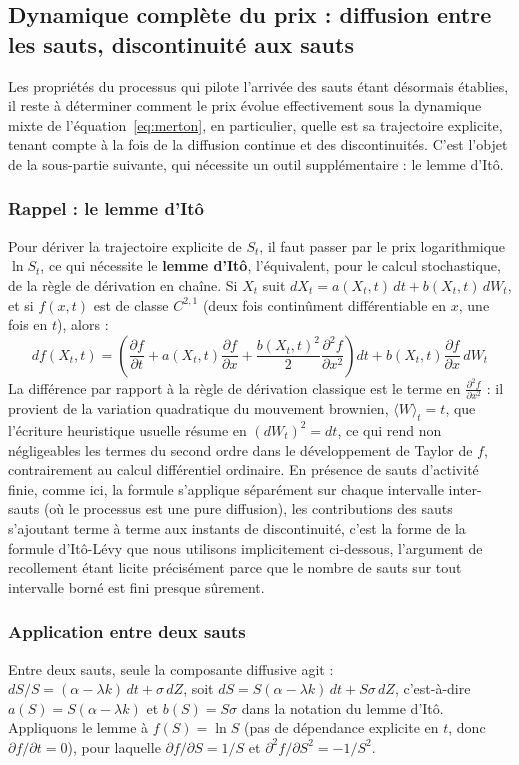\documentclass{article}
\begin{document}
\subsection{Dynamique complète du prix : diffusion entre les sauts, discontinuité aux sauts}
Les propriétés du processus qui pilote l'arrivée des sauts étant désormais établies, il reste à déterminer comment le prix évolue effectivement sous la dynamique mixte de l'équation~\eqref{eq:merton}, en particulier, quelle est sa trajectoire explicite, tenant compte à la fois de la diffusion continue et des discontinuités. C'est l'objet de la sous-partie suivante, qui nécessite un outil supplémentaire : le lemme d'Itô.
\subsubsection*{Rappel : le lemme d'Itô}
Pour dériver la trajectoire explicite de $S_t$, il faut passer par le prix logarithmique $\ln S_t$, ce qui nécessite le \textbf{lemme d'Itô}, l'équivalent, pour le calcul stochastique, de la règle de dérivation en chaîne. Si $X_t$ suit $dX_t = a(X_t,t)\,dt + b(X_t,t)\,dW_t$, et si $f(x,t)$ est de classe $C^{2,1}$ (deux fois continûment différentiable en $x$, une fois en $t$), alors :
\begin{equation}
df(X_t,t) = \left(\frac{\partial f}{\partial t} + a(X_t,t)\frac{\partial f}{\partial x} + \frac{b(X_t,t)^2}{2}\frac{\partial^2 f}{\partial x^2}\right) dt + b(X_t,t)\frac{\partial f}{\partial x}\, dW_t
\end{equation}
La différence par rapport à la règle de dérivation classique est le terme en $\frac{\partial^2 f}{\partial x^2}$ : il provient de la variation quadratique du mouvement brownien, $\langle W\rangle_t = t$, que l'écriture heuristique usuelle résume en $(dW_t)^2 = dt$, ce qui rend non négligeables les termes du second ordre dans le développement de Taylor de $f$, contrairement au calcul différentiel ordinaire. En présence de sauts d'activité finie, comme ici, la formule s'applique séparément sur chaque intervalle inter-sauts (où le processus est une pure diffusion), les contributions des sauts s'ajoutant terme à terme aux instants de discontinuité, c'est la forme de la formule d'Itô-Lévy que nous utilisons implicitement ci-dessous, l'argument de recollement étant licite précisément parce que le nombre de sauts sur tout intervalle borné est fini presque sûrement.
\subsubsection*{Application entre deux sauts}
Entre deux sauts, seule la composante diffusive agit : $dS/S = (\alpha-\lambda k)\,dt + \sigma\, dZ$, soit $dS = S(\alpha-\lambda k)\,dt + S\sigma\, dZ$, c'est-à-dire $a(S) = S(\alpha-\lambda k)$ et $b(S) = S\sigma$ dans la notation du lemme d'Itô. Appliquons le lemme à $f(S) = \ln S$ (pas de dépendance explicite en $t$, donc $\partial f/\partial t = 0$), pour laquelle $\partial f/\partial S = 1/S$ et $\partial^2 f/\partial S^2 = -1/S^2$.
\end{document}
